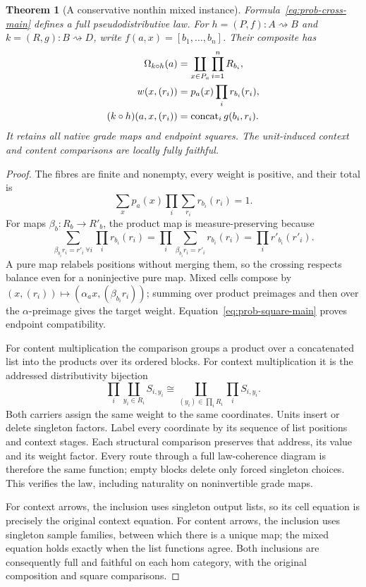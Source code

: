 \documentclass[11pt]{article}
\numberwithin{equation}{section}
\newtheorem{theorem}{Theorem}[section]
\theoremstyle{definition}\newtheorem{definition}[theorem]{Definition}
\begin{document}
\begin{theorem}[A conservative nonthin mixed instance]\label{thm:problaw}
Formula~\eqref{eq:prob-cross-main} defines a full pseudodistributive law.
For $h=(P,f):A\rightsquigarrow B$ and $k=(R,g):B\rightsquigarrow D$,
write $f(a,x)=[b_1,\ldots,b_n]$. Their composite has
\begin{align}
 \Omega_{k\circ h}(a)&=\coprod_{x\in P_a}\prod_{i=1}^nR_{b_i},
       \label{eq:prob-comp-main}\\
 w(x,(r_i))&=p_a(x)\prod_i r_{b_i}(r_i),\notag\\
 (k\circ h)(a,x,(r_i))&=\operatorname{concat}_i g(b_i,r_i).\notag
\end{align}
It retains all native grade maps and endpoint squares. The unit-induced
context and content comparisons are locally fully faithful.
\end{theorem}
\begin{proof}
The fibres are finite and nonempty, every weight is positive, and their
total is
\[\sum_xp_a(x)\prod_i\sum_{r_i}r_{b_i}(r_i)=1.\]
For maps $\beta_b:R_b\to R'_b$, the product map is measure-preserving
because
\[
 \sum_{\beta_{b_i}r_i=r'_i\ \forall i}\prod_i r_{b_i}(r_i)
   =\prod_i\sum_{\beta_{b_i}r_i=r'_i}r_{b_i}(r_i)
   =\prod_i r'_{b_i}(r'_i).
\]
A pure map relabels positions without merging them, so the crossing respects
balance even for a noninjective pure map. Mixed cells compose by
$(x,(r_i))\mapsto(\alpha_ax,(\beta_{b_i}r_i))$; summing over product
preimages and then over the $\alpha$-preimage gives the target weight.
Equation~\eqref{eq:prob-square-main} proves endpoint compatibility.

For content multiplication the comparison groups a product over a
concatenated list into the products over its ordered blocks. For context
multiplication it is the addressed distributivity bijection
\[
 \prod_i\coprod_{y_i\in R_i}S_{i,y_i}
       \cong\coprod_{(y_i)\in\prod_iR_i}\prod_iS_{i,y_i}.
\]
Both carriers assign the same weight to the same coordinates. Units insert
or delete singleton factors. Label every coordinate by its sequence of list
positions and context stages. Each structural comparison preserves that
address, its value and its weight factor. Every route through a full
law-coherence diagram is therefore the same function; empty blocks delete
only forced singleton choices. This verifies the law, including naturality
on noninvertible grade maps.

For context arrows, the inclusion uses singleton output lists, so its cell
equation is precisely the original context equation. For content arrows,
the inclusion uses singleton sample families, between which there is a
unique map; the mixed equation holds exactly when the list functions agree.
Both inclusions are consequently full and faithful on each hom category,
with the original composition and square comparisons.
\end{proof}
\end{document}

